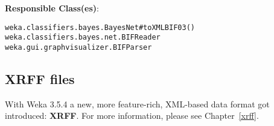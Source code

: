 \noindent \textbf{Responsible Class(es)}:

\begin{verbatim}
weka.classifiers.bayes.BayesNet#toXMLBIF03()
weka.classifiers.bayes.net.BIFReader
weka.gui.graphvisualizer.BIFParser
\end{verbatim}

\subsection{XRFF files}
With Weka 3.5.4 a new, more feature-rich, XML-based data format got
introduced: \textbf{XRFF}. For more information, please see
Chapter~\ref{xrff}.

